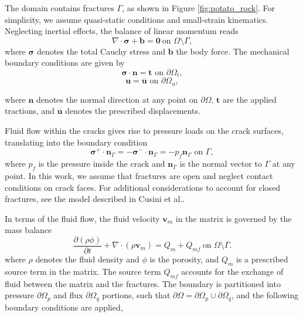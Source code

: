 The domain contains fractures $\Gamma$, as shown in Figure \ref{fig:potato_rock}.  For simplicity, we assume quasi-static conditions and small-strain kinematics.   Neglecting inertial effects, the balance of linear momentum reads
\begin{equation}\label{linear momentum balance}
    \nabla \cdot \boldsymbol\sigma + \textbf{b} = \boldsymbol 0\ \text{on } \Omega\setminus\Gamma,
\end{equation}
where $\boldsymbol\sigma$ denotes the total Cauchy stress and $\textbf{b}$ the body force. The mechanical boundary conditions are given by
\begin{equation}\label{traction bc}
    \boldsymbol \sigma \cdot \textbf{n} = \textbf{t} \text{ on } \partial \Omega_t,
\end{equation}
\begin{equation}\label{displacement bc}
    \textbf{u} = \overline{\textbf{u}} \text{ on } \partial \Omega_u,
\end{equation}

where $\textbf{n}$ denotes the normal direction at any point on $\partial\Omega$,  $\textbf{t}$ are the applied tractions, and $\overline{\textbf{u}}$ denotes the prescribed displacements.

Fluid flow within the cracks gives rise to pressure loads on the crack surfaces, translating into the boundary condition 
\begin{equation}\label{fracture boundary condition}
    \boldsymbol\sigma^+\cdot \textbf{n}_{\Gamma} = -\boldsymbol\sigma^-\cdot \textbf{n}_{\Gamma} = -p_f\textbf{n}_{\Gamma} \text{ on } \Gamma,
\end{equation}
where $p_f$ is the pressure inside the crack and $\textbf{n}_{\Gamma}$ is the normal vector to $\Gamma$ at any point.  In this work, we assume that fractures are open and neglect contact conditions on crack faces.  For additional considerations to account for closed fractures, see the model described in Cusini et al.\cite{cusini2021simulation}.

In terms of the fluid flow, the fluid velocity $\textbf{v}_m$ in the matrix is governed by the mass balance 
\begin{equation}\label{mass balance matrix}
    \dfrac{\partial(\rho \phi)}{\partial t} + \nabla \cdot (\rho \textbf{v}_m) = Q_m + Q_{mf}\ \text{on } \Omega\setminus\Gamma.
\end{equation}
where $\rho$ denotes the fluid density and $\phi$ is the porosity, and $Q_m$ is a prescribed source term in the matrix. The source term $Q_{mf}$ accounts for the exchange of fluid between the matrix and the fractures.
The boundary is partitioned into pressure $\partial \Omega_p$ and flux $\partial\Omega_q$ portions, such that $\partial \Omega = \partial \Omega_p \cup \partial \Omega_q$, and the following boundary conditions are applied,

